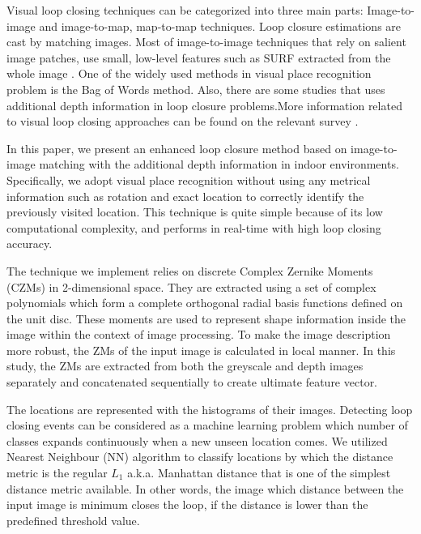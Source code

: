 \documentclass[]{spie}  %
\begin{document}
Visual loop closing techniques can be categorized into three main parts\cite{Williams09}: Image-to-image and image-to-map, map-to-map techniques. Loop closure estimations\cite{sariyanidi_spie13}  are cast by matching images. Most of image-to-image techniques that rely on salient image patches, use small, low-level features such as SURF\cite{springerlink:10.1007/11744023_32} extracted from the whole image \cite{sariyanidi_iv, HoNewmanCIRA2005, CumminsNewmanIJRR08}. One of the widely used methods in visual place recognition problem is the Bag of Words\cite{1238663} method. Also, there are some studies that uses additional depth information\cite{kerl2013-IROS} in loop closure problems.More information related to visual loop closing approaches can be found on the relevant survey \cite{Williams09}.

In this paper, we present an enhanced loop closure method based on image-to-image matching with the additional depth information in indoor environments. Specifically, we adopt visual place recognition without using any metrical information such as rotation and exact location to correctly identify the previously visited location. This technique is quite simple because of its low computational complexity, and performs in real-time with high loop closing accuracy. 

The technique we implement relies on discrete Complex Zernike Moments (CZMs) in 2-dimensional space. They are extracted using a set of complex polynomials which form a complete orthogonal radial basis functions defined on the unit disc. These moments are used to represent shape information inside the image within the context of image processing. To make the image description more robust, the ZMs of the input image is calculated in local manner. In this study, the ZMs are extracted from both the greyscale and depth images separately and concatenated sequentially to create ultimate feature vector.

The locations are represented with the histograms of their images. Detecting loop closing events can be considered as a machine learning problem which number of classes expands continuously when a new unseen location comes. We utilized Nearest Neighbour (NN) algorithm to classify locations by which the distance metric is the regular $L_1$ a.k.a. Manhattan distance that is one of the simplest distance metric available. In other words, the image which distance between the input image is minimum closes the loop, if the distance is lower than the predefined threshold value. 
\end{document}
